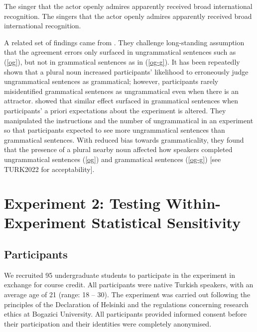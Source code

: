 \documentclass[
  authoryear,
  3p]{elsarticle}
\begin{document}
\begin{exe}
\ex \label{malsburg}
\begin{xlist}
\ex \label{malsburg-singer} The singer that the actor openly admires apparently received broad international recognition.
\ex \label{malsburg-singers} The singers that the actor openly admires apparently received broad international recognition.
\end{xlist}
\end{exe}

A related set of findings came from \citet{HammerlyEtAl2019}. They
challenge long-standing assumption that the agreement errors only
surfaced in ungrammatical sentences such as (\ref{og}), but not in
grammatical sentences as in (\ref{og-g}). It has been repeatedly shown
that a plural noun increased participants' likelihood to erroneously
judge ungrammatical sentences as grammatical; however, participants
rarely misidentified grammatical sentences as ungrammatical even when
there is an attractor. \citet{HammerlyEtAl2019} showed that similar
effect surfaced in grammatical sentences when participants' a priori
expectations about the experiment is altered. They manipulated the
instructions and the number of ungrammatical in an experiment so that
participants expected to see more ungrammatical sentences than
grammatical sentences. With reduced bias towards grammaticality, they
found that the presence of a plural nearby noun affected how speakers
completed ungrammatical sentences (\ref{og}) and grammatical sentences
(\ref{og-g}) {[}see TURK2022 for acceptability{]}.

\begin{exe}
\end{exe}

\section{Experiment 2: Testing Within-Experiment Statistical
Sensitivity}\label{experiment-2-testing-within-experiment-statistical-sensitivity}

\subsection{Participants}\label{participants-1}

We recruited 95 undergraduate students to participate in the experiment
in exchange for course credit. All participants were native Turkish
speakers, with an average age of 21 (range: 18 -- 30). The experiment
was carried out following the principles of the Declaration of Helsinki
and the regulations concerning research ethics at Bogazici University.
All participants provided informed consent before their participation
and their identities were completely anonymised.
\end{document}
